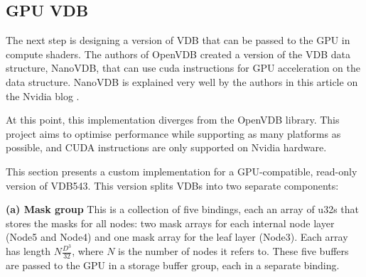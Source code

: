 \subsection{GPU VDB}

The next step is designing a version of VDB that can be passed to the GPU in compute shaders. The authors of OpenVDB created a version of the VDB data structure, NanoVDB\supercite{nanovdb:doc}, that can use \acrshort{cuda} instructions for GPU acceleration on the data structure. NanoVDB is explained very well by the authors in this article on the Nvidia blog \cite{nanovdb:art}.

At this point, this implementation diverges from the OpenVDB library. This project aims to optimise performance while supporting as many platforms as possible, and CUDA instructions are only supported on Nvidia hardware.

This section presents a custom implementation for a GPU-compatible, read-only version of VDB543. This version splits VDBs into two separate components:

\textbf{(a) Mask group} This is a collection of five bindings, each an array of u32s that stores the masks for all nodes: two mask arrays for each internal node layer (Node5 and Node4) and one mask array for the leaf layer (Node3). Each array has length $N\frac{D^{3}}{32}$, where $N$ is the number of nodes it refers to. These five buffers are passed to the GPU in a storage buffer group, each in a separate binding.

